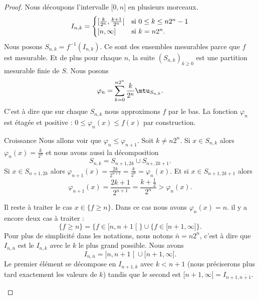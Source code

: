 \begin{proof}
    Nous découpons l'intervalle \( \mathopen[ 0 , n \mathclose]\) en plusieurs morceaux.
    \begin{equation}
        I_{n,k}=\begin{cases}
            \mathopen[ \frac{ k }{ 2^n } , \frac{ k+1 }{ 2^n } \mathclose[    &   \text{si \( 0\leq k\leq n2^n-1\)}\\
                \mathopen[ n , \infty \mathclose]    &    \text{si \( k=n2^n\)}.
        \end{cases}
    \end{equation}
    Nous posons \( S_{n,k}=f^{-1}(I_{n,k})\). Ce sont des ensembles mesurables parce que \( f\) est mesurable. Et de plus pour chaque \( n\), la suite \( (S_{n,k})_{k\geq 0}\) est une partition mesurable finie de \( S\). Nous posons
    \begin{equation}
        \varphi_n=\sum_{k=0}^{n2^n}\frac{ k }{ 2^n }\mtu_{S_{n,k}}.
    \end{equation}
    C'est à dire que sur chaque \( S_{n,k}\) nous approximons \( f\) par le bas. La fonction \( \varphi_n\) est étagée et positive : \( 0\leq \varphi_n(x)\leq f(x)\) par construction.
    \begin{subproof}
    \item[Croissance]
        Nous allons voir que \( \varphi_n\leq \varphi_{n+1}\). Soit \( k\neq n2^n\). Si \( x\in S_{n,k}\) alors \( \varphi_n(x)=\frac{ k }{ 2^n }\) et nous avons aussi la décomposition
        \begin{equation}
            S_{n,k}=S_{n+1,2k}\cup S_{n+,2k+1}.
        \end{equation}
        Si \( x\in S_{n+1,2k}\) alors \( \varphi_{n+1}(x)=\frac{ 2k }{ 2^{n+1} }=\frac{ k }{ 2^n }=\varphi_n(x)\). Et si \( x\in S_{n+1,2k+1}\) alors
        \begin{equation}
            \varphi_{n+1}(x)=\frac{ 2k+1 }{ 2^{n+1} }=\frac{ k+\frac{ 1 }{2} }{ 2^n }>\varphi_n(x).
        \end{equation}
        
        Il reste à traiter le cas \( x\in\{ f\geq n \}\). Dans ce cas nous avons \( \varphi_n(x)=n\). il y a encore deux cas à traiter : 
        \begin{equation}
            \{ f\geq n \}=\{ f\in\mathopen[ n , n+1 \mathclose[ \}\cup\{ f\in\mathopen[ n+1 , \infty \mathclose] \}.
        \end{equation}
        Pour plus de simplicité dans les notations, nous notons \( \bar n=n2^n\), c'est à dire que \( I_{n,\bar n}\) est le \( I_{n,k}\) avec le \( k\) le plus grand possible. Nous avons
        \begin{equation}
            I_{n,\bar n}=\mathopen[ n , n+1 \mathclose[\cup\mathopen[ n+1 , \infty \mathclose].
        \end{equation}
        Le premier élément se décompose en \( I_{n+1,k}\) avec \( k<n+1\) (nous préciserons plus tard exactement les valeurs de \( k\)) tandis que le second est \( \mathopen[ n+1 , \infty \mathclose]=I_{n+1,\overline{ n+1 }}\).


\end{subproof}
\end{proof}
